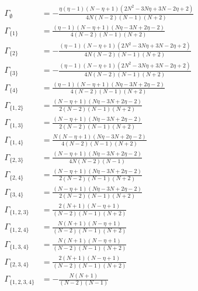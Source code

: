 \documentclass[11pt]{article}
\begin{document}
\begin{align*}
  \Gamma_{\emptyset} &= - \frac{\eta \left(\eta - 1\right) \left(N - \eta + 1\right) \left(2 N^{2} - 3 N \eta + 3 N - 2 \eta + 2\right)}{4 N \left(N - 2\right) \left(N - 1\right) \left(N + 2\right)} \\
  \Gamma_{\{1\}} &= \frac{\left(\eta - 1\right) \left(N - \eta + 1\right) \left(N \eta - 3 N + 2 \eta - 2\right)}{4 \left(N - 2\right) \left(N - 1\right) \left(N + 2\right)} \\
  \Gamma_{\{2\}} &= - \frac{\left(\eta - 1\right) \left(N - \eta + 1\right) \left(2 N^{2} - 3 N \eta + 3 N - 2 \eta + 2\right)}{4 N \left(N - 2\right) \left(N - 1\right) \left(N + 2\right)} \\
  \Gamma_{\{3\}} &= - \frac{\left(\eta - 1\right) \left(N - \eta + 1\right) \left(2 N^{2} - 3 N \eta + 3 N - 2 \eta + 2\right)}{4 N \left(N - 2\right) \left(N - 1\right) \left(N + 2\right)} \\
  \Gamma_{\{4\}} &= \frac{\left(\eta - 1\right) \left(N - \eta + 1\right) \left(N \eta - 3 N + 2 \eta - 2\right)}{4 \left(N - 2\right) \left(N - 1\right) \left(N + 2\right)} \\
  \Gamma_{\{1,2\}} &= \frac{\left(N - \eta + 1\right) \left(N \eta - 3 N + 2 \eta - 2\right)}{2 \left(N - 2\right) \left(N - 1\right) \left(N + 2\right)} \\
  \Gamma_{\{1,3\}} &= \frac{\left(N - \eta + 1\right) \left(N \eta - 3 N + 2 \eta - 2\right)}{2 \left(N - 2\right) \left(N - 1\right) \left(N + 2\right)} \\
  \Gamma_{\{1,4\}} &= \frac{N \left(N - \eta + 1\right) \left(N \eta - 3 N + 2 \eta - 2\right)}{4 \left(N - 2\right) \left(N - 1\right) \left(N + 2\right)} \\
  \Gamma_{\{2,3\}} &= \frac{\left(N - \eta + 1\right) \left(N \eta - 3 N + 2 \eta - 2\right)}{4 N \left(N - 2\right) \left(N - 1\right)} \\
  \Gamma_{\{2,4\}} &= \frac{\left(N - \eta + 1\right) \left(N \eta - 3 N + 2 \eta - 2\right)}{2 \left(N - 2\right) \left(N - 1\right) \left(N + 2\right)} \\
  \Gamma_{\{3,4\}} &= \frac{\left(N - \eta + 1\right) \left(N \eta - 3 N + 2 \eta - 2\right)}{2 \left(N - 2\right) \left(N - 1\right) \left(N + 2\right)} \\
  \Gamma_{\{1,2,3\}} &= \frac{2 \left(N + 1\right) \left(N - \eta + 1\right)}{\left(N - 2\right) \left(N - 1\right) \left(N + 2\right)} \\
  \Gamma_{\{1,2,4\}} &= \frac{N \left(N + 1\right) \left(N - \eta + 1\right)}{\left(N - 2\right) \left(N - 1\right) \left(N + 2\right)} \\
  \Gamma_{\{1,3,4\}} &= \frac{N \left(N + 1\right) \left(N - \eta + 1\right)}{\left(N - 2\right) \left(N - 1\right) \left(N + 2\right)} \\
  \Gamma_{\{2,3,4\}} &= \frac{2 \left(N + 1\right) \left(N - \eta + 1\right)}{\left(N - 2\right) \left(N - 1\right) \left(N + 2\right)} \\
  \Gamma_{\{1,2,3,4\}} &= - \frac{N \left(N + 1\right)}{\left(N - 2\right) \left(N - 1\right)} 
\end{align*}
\end{document}
